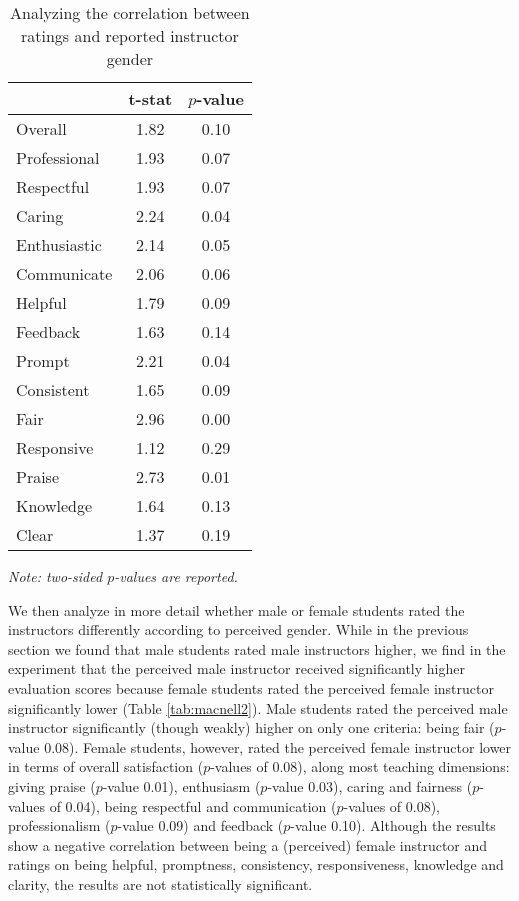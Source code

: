 \documentclass[12pt]{article}
\begin{document}
\begin{table}[htbp]
  \centering
  \footnotesize 
  \caption{Analyzing the correlation between ratings and reported instructor gender}
    \begin{tabular}{lcc}
    \toprule 
                          & t-stat  & $p$-value  \\
   \midrule
    Overall &                 1.82       & 0.10   \\
    Professional &            1.93       & 0.07   \\
    Respectful			   &  1.93       & 0.07   \\
    Caring &                  2.24       & 0.04    \\
    Enthusiastic   &          2.14       & 0.05     \\
    Communicate        &      2.06       & 0.06     \\
    Helpful   &               1.79       & 0.09     \\
    Feedback   &              1.63       & 0.14     \\
    Prompt    &               2.21       & 0.04     \\
    Consistent   &            1.65       & 0.09     \\
    Fair   &                  2.96       & 0.00     \\
    Responsive   &            1.12       & 0.29     \\
    Praise   &                2.73       & 0.01     \\
    Knowledge   &             1.64       & 0.13     \\
    Clear   &                 1.37       & 0.19     \\
    \bottomrule
    \end{tabular}%
 \label{tab:macnell1}%
  
  \textit{Note: two-sided $p$-values are reported.}
\end{table}%
\normalsize


We then analyze in more detail whether male or female students rated the instructors differently according to perceived gender. While in the previous section we found that male students rated male instructors higher, we find in the \citet{MacNell2014} experiment that the perceived male instructor received significantly higher evaluation scores because female students rated the perceived female instructor significantly lower (Table  \ref{tab:macnell2}). Male students rated the perceived male instructor significantly (though weakly) higher on only one criteria: being fair ($p$-value 0.08). Female students, however, rated the perceived female instructor lower in terms of overall satisfaction ($p$-values of 0.08), along most teaching dimensions: giving praise ($p$-value 0.01), enthusiasm ($p$-value 0.03), caring and fairness ($p$-values of 0.04), being respectful and communication ($p$-values of 0.08), professionalism ($p$-value 0.09) and feedback ($p$-value 0.10). Although the results show a negative correlation between being a (perceived) female instructor and ratings on being helpful, promptness, consistency, responsiveness, knowledge and clarity, the results are not statistically significant.
\end{document}

